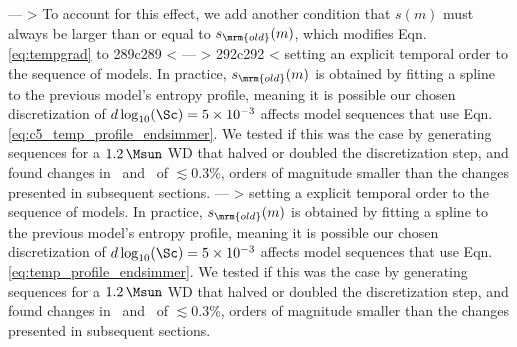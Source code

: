 ---
> To account for this effect, we add another condition that $s(m)$ must always be larger than or equal to $s_\mrm{old}(m)$, which modifies Eqn. \ref{eq:tempgrad} to
289c289
< \label{eq:c5_temp_profile_endsimmer}
---
> \label{eq:temp_profile_endsimmer}
292c292
< \noindent setting an explicit temporal order to the sequence of models.  In practice, $s_\mrm{old}(m)$ is obtained by fitting a spline to the previous model's entropy profile, meaning it is possible our chosen discretization of $d\log_{10}(\Sc) = 5 \times 10^{-3}$ affects model sequences that use Eqn. \ref{eq:c5_temp_profile_endsimmer}.  We tested if this was the case by generating sequences for a $1.2\,\Msun$ WD that halved or doubled the discretization step, and found changes in \rhoc\ and \Tc\ of $\lesssim0.3$\%, orders of magnitude smaller than the changes presented in subsequent sections.
---
> \noindent setting a explicit temporal order to the sequence of models.  In practice, $s_\mrm{old}(m)$ is obtained by fitting a spline to the previous model's entropy profile, meaning it is possible our chosen discretization of $d\log_{10}(\Sc) = 5 \times 10^{-3}$ affects model sequences that use Eqn. \ref{eq:temp_profile_endsimmer}.  We tested if this was the case by generating sequences for a $1.2\,\Msun$ WD that halved or doubled the discretization step, and found changes in \rhoc\ and \Tc\ of $\lesssim0.3$\%, orders of magnitude smaller than the changes presented in subsequent sections.
